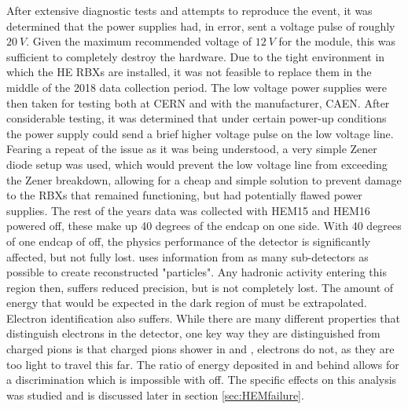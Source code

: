 After extensive diagnostic tests and attempts to reproduce the event, it was determined that the power supplies had, in error, sent a voltage pulse of roughly \ensuremath{\SI{20}{V}}. Given the maximum recommended voltage of \ensuremath{\SI{12}{V}} for the module, this was sufficient to completely destroy the hardware. Due to the tight environment in which the HE RBXs are installed, it was not feasible to replace them in the middle of the 2018 data collection period. The low voltage power supplies were then taken for testing both at CERN and with the manufacturer, CAEN. After considerable testing, it was determined that under certain power-up conditions the power supply could send a brief higher voltage pulse on the low voltage line. Fearing a repeat of the issue as it was being understood, a very simple Zener diode setup was used, which would prevent the low voltage line from exceeding the Zener breakdown, allowing for a cheap and simple solution to prevent damage to the RBXs that remained functioning, but had potentially flawed power supplies. The rest of the years data was collected with HEM15 and HEM16 powered off, these make up 40 degrees of the endcap on one side.  
With 40 degrees of one endcap of \HCAL off, the physics performance of the detector is significantly affected, but not fully lost. \CMS uses information from as many sub-detectors as possible to create reconstructed "particles". Any hadronic activity entering this region then, suffers reduced precision, but is not completely lost. The amount of energy that would be expected in the dark region of \HCAL must be extrapolated. Electron identification also suffers. While there are many different properties that distinguish electrons in the detector, one key way they are distinguished from charged pions is that charged pions shower in \ECAL and \HCAL, electrons do not, as they are too light to travel this far. The ratio of energy deposited in \ECAL and \HCAL behind allows for a discrimination which is impossible with \HCAL off. The specific effects on this analysis was studied and is discussed later in section \ref{sec:HEMfailure}.





